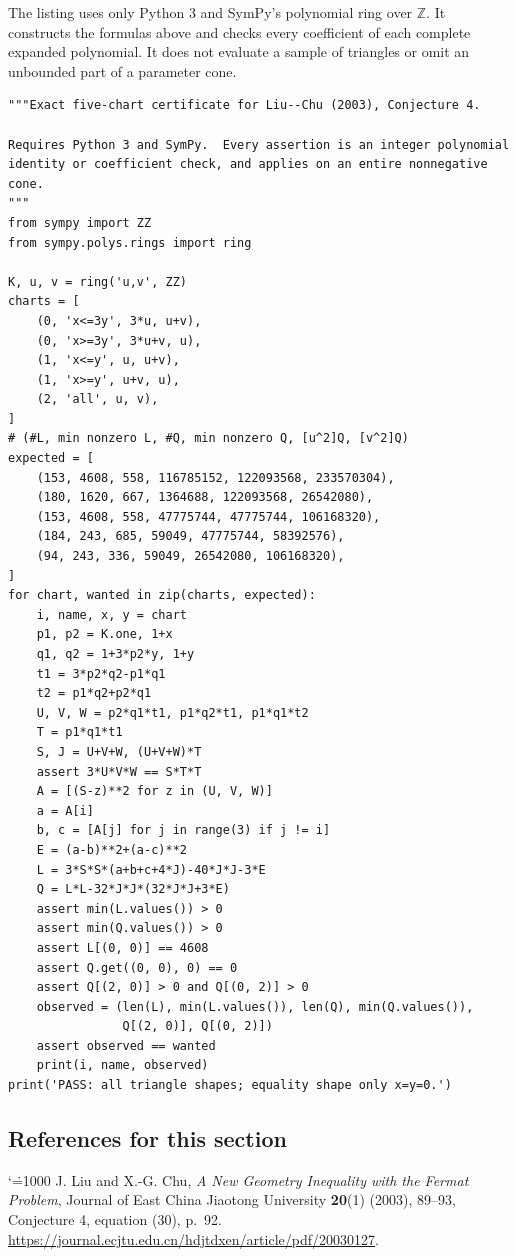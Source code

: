 \documentclass[11pt,a4paper]{article}
\makeatletter
\numberwithin{equation}{section}
\theoremstyle{definition}
\theoremstyle{remark}
\renewenvironment{thebibliography}[1]
 {\subsection*{References for this section}\small
  \list{\@biblabel{\@arabic\c@enumiv}}
       {\settowidth\labelwidth{\@biblabel{#1}}\leftmargin\labelwidth
        \advance\leftmargin\labelsep\@openbib@code
        \usecounter{enumiv}\let\p@enumiv\@empty
        \renewcommand\theenumiv{\@arabic\c@enumiv}}
  \sloppy\clubpenalty4000\widowpenalty4000\sfcode`\.=1000\relax}
 {\def\@noitemerr{\@latex@warning{Empty bibliography}}\endlist}
\makeatother
\begin{document}
The listing uses only Python 3 and SymPy's polynomial ring over
$\mathbb Z$. It constructs the formulas above and checks every
coefficient of each complete expanded polynomial. It does not evaluate
a sample of triangles or omit an unbounded part of a parameter cone.
\begin{Verbatim}
"""Exact five-chart certificate for Liu--Chu (2003), Conjecture 4.

Requires Python 3 and SymPy.  Every assertion is an integer polynomial
identity or coefficient check, and applies on an entire nonnegative cone.
"""
from sympy import ZZ
from sympy.polys.rings import ring

K, u, v = ring('u,v', ZZ)
charts = [
    (0, 'x<=3y', 3*u, u+v),
    (0, 'x>=3y', 3*u+v, u),
    (1, 'x<=y', u, u+v),
    (1, 'x>=y', u+v, u),
    (2, 'all', u, v),
]
# (#L, min nonzero L, #Q, min nonzero Q, [u^2]Q, [v^2]Q)
expected = [
    (153, 4608, 558, 116785152, 122093568, 233570304),
    (180, 1620, 667, 1364688, 122093568, 26542080),
    (153, 4608, 558, 47775744, 47775744, 106168320),
    (184, 243, 685, 59049, 47775744, 58392576),
    (94, 243, 336, 59049, 26542080, 106168320),
]
for chart, wanted in zip(charts, expected):
    i, name, x, y = chart
    p1, p2 = K.one, 1+x
    q1, q2 = 1+3*p2*y, 1+y
    t1 = 3*p2*q2-p1*q1
    t2 = p1*q2+p2*q1
    U, V, W = p2*q1*t1, p1*q2*t1, p1*q1*t2
    T = p1*q1*t1
    S, J = U+V+W, (U+V+W)*T
    assert 3*U*V*W == S*T*T
    A = [(S-z)**2 for z in (U, V, W)]
    a = A[i]
    b, c = [A[j] for j in range(3) if j != i]
    E = (a-b)**2+(a-c)**2
    L = 3*S*S*(a+b+c+4*J)-40*J*J-3*E
    Q = L*L-32*J*J*(32*J*J+3*E)
    assert min(L.values()) > 0
    assert min(Q.values()) > 0
    assert L[(0, 0)] == 4608
    assert Q.get((0, 0), 0) == 0
    assert Q[(2, 0)] > 0 and Q[(0, 2)] > 0
    observed = (len(L), min(L.values()), len(Q), min(Q.values()),
                Q[(2, 0)], Q[(0, 2)])
    assert observed == wanted
    print(i, name, observed)
print('PASS: all triangle shapes; equality shape only x=y=0.')
\end{Verbatim}


\begin{thebibliography}{9}
 J. Liu and X.-G. Chu,
\emph{A New Geometry Inequality with the Fermat Problem},
Journal of East China Jiaotong University \textbf{20}(1) (2003),
89--93, Conjecture 4, equation (30), p.~92.
\url{https://journal.ecjtu.edu.cn/hdjtdxen/article/pdf/20030127}.
\end{thebibliography}

\par\endgroup
\end{document}
